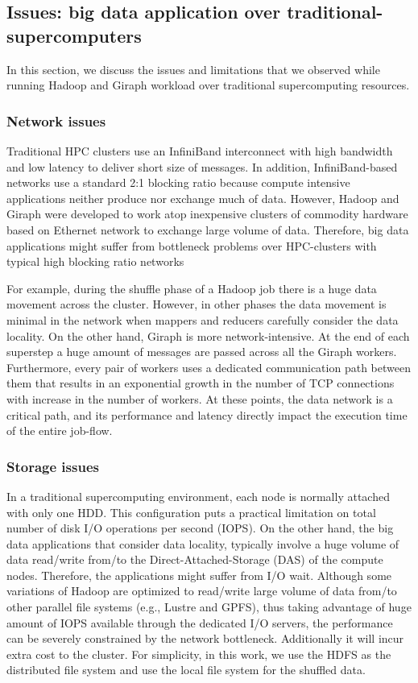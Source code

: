 \documentclass[conference]{IEEEtran}
\begin{document}
\subsection {Issues: big data application over traditional-supercomputers}
In this section, we discuss the issues and limitations that we observed while running Hadoop and Giraph workload over traditional supercomputing resources. 
\subsubsection {Network issues}
Traditional HPC clusters use an InfiniBand interconnect with high bandwidth and low latency to deliver short size of messages. In addition, InfiniBand-based networks use a standard 2:1 blocking ratio because compute intensive applications neither produce nor exchange much of data. However, Hadoop and Giraph were developed to work atop inexpensive clusters of commodity hardware based on Ethernet network to exchange large volume of data. Therefore, big data applications might suffer from bottleneck problems over HPC-clusters with typical high blocking ratio networks

For example, during the shuffle phase of a Hadoop job there is a huge data movement across the cluster. However, in other phases the data movement is minimal in the network when mappers and reducers carefully consider the data locality. On the other hand, Giraph is more network-intensive. At the end of each superstep a huge amount of messages are passed across all the Giraph workers. Furthermore, every pair of workers uses a dedicated communication path between them that results in an exponential growth in the number of TCP connections with increase in the number of workers. At these points, the data network is a critical path, and its performance and latency directly impact the execution time of the entire job-flow.
\subsubsection {Storage issues}
In a traditional supercomputing environment, each node is normally attached with only one HDD. This configuration puts a practical limitation on total number of disk I/O operations per second (IOPS). On the other hand, the big data applications that consider data locality, typically involve a huge volume of data read/write from/to the Direct-Attached-Storage (DAS) of the compute nodes. Therefore, the applications might suffer from I/O wait. Although some variations of Hadoop are optimized to read/write large volume of data from/to other parallel file systems (e.g., Lustre and GPFS), thus taking advantage of huge amount of IOPS available through the dedicated I/O servers, the performance can be severely constrained by the network bottleneck. Additionally it will incur extra cost to the cluster. For simplicity, in this work, we use the HDFS as the distributed file system and use the local file system for the shuffled data.
\end{document}
